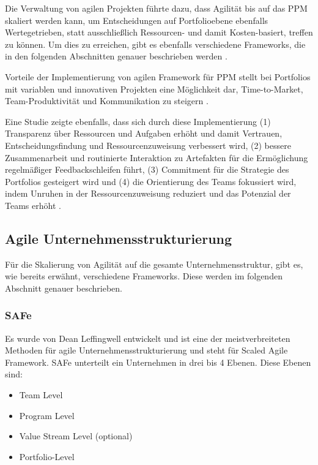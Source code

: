 Die Verwaltung von agilen Projekten führte dazu, dass Agilität bis auf das PPM skaliert werden kann, um Entscheidungen auf Portfolioebene ebenfalls Wertegetrieben, statt ausschließlich Ressourcen- und damit Kosten-basiert, treffen zu können. Um dies zu erreichen, gibt es ebenfalls verschiedene Frameworks, die in den folgenden Abschnitten genauer beschrieben werden \cite{SUAREZ2022-1}.

Vorteile der Implementierung von agilen Framework für PPM stellt bei Portfolios mit variablen und innovativen Projekten eine Möglichkeit dar, Time-to-Market, Team-Produktivität und Kommunikation zu steigern \cite{SUAREZ2022-2}.

Eine Studie zeigte ebenfalls, dass sich durch diese Implementierung (1) Transparenz über Ressourcen und Aufgaben erhöht und damit Vertrauen, Entscheidungsfindung und Ressourcenzuweisung verbessert wird, (2) bessere Zusammenarbeit und routinierte Interaktion zu Artefakten für die Ermöglichung regelmäßiger Feedbackschleifen führt, (3) Commitment für die Strategie des Portfolios gesteigert wird und (4) die Orientierung des Teams fokussiert wird, indem Unruhen in der Ressourcenzuweisung reduziert und das Potenzial der Teams erhöht \cite{anEmpiricalPerspectiveOnThePractiveInUse}.

\subsection{Agile Unternehmensstrukturierung}
Für die Skalierung von Agilität auf die gesamte Unternehmensstruktur, gibt es, wie bereits erwähnt, verschiedene Frameworks. Diese werden im folgenden Abschnitt genauer beschrieben.

\subsubsection{SAFe}
Es wurde von Dean Leffingwell entwickelt und ist eine der meistverbreiteten Methoden für agile Unternehmensstrukturierung und steht für Scaled Agile Framework.
SAFe unterteilt ein Unternehmen in drei bis 4 Ebenen. Diese Ebenen sind:

\begin{itemize}
    \item Team Level
    \item Program Level
    \item Value Stream Level (optional)
    \item Portfolio-Level
\end{itemize}

